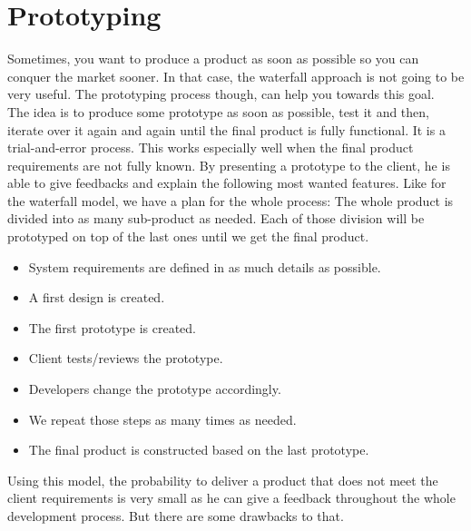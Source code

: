 \documentclass[12pt]{article}
\theoremstyle{definition}
\theoremstyle{definition}
\theoremstyle{remark}
\begin{document}

\section{Prototyping}


Sometimes, you want to produce a product as soon as possible so you can conquer the market sooner. In that case, the waterfall approach is not going to be very useful. The prototyping process though, can help you towards this goal.~\cite{Software_prototyping:2018}\\

The idea is to produce some prototype as soon as possible, test it and then, iterate over it again and again until the final product is fully functional. It is a trial-and-error process. This works especially well when the final product requirements are not fully known. By presenting a prototype to the client, he is able to give feedbacks and explain the following most wanted features. Like for the waterfall model, we have a plan for the whole process: The whole product is divided into as many sub-product as needed. Each of those division will be prototyped on top of the last ones until we get the final product.\\

\begin{itemize}

\item System requirements are defined in as much details as possible.
\item A first design is created.
\item The first prototype is created.
\item Client tests/reviews the prototype.
\item Developers change the prototype accordingly.
\item We repeat those steps as many times as needed.
\item The final product is constructed based on the last prototype.

\end{itemize}

Using this model, the probability to deliver a product that does not meet the client requirements is very small as he can give a feedback throughout the whole development process. But there are some drawbacks to that.\\
\end{document}
